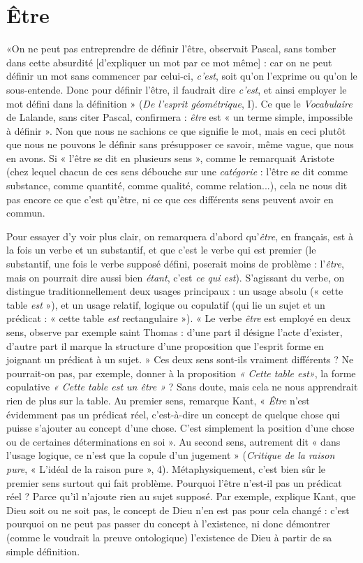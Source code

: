 \section{Être}
«On ne peut pas entreprendre de définir l’être, observait Pascal, sans
tomber dans cette absurdité [d’expliquer un mot par ce mot même] :
car on ne peut définir un mot sans commencer par celui-ci, {\it c'est}, soit qu’on
l’exprime ou qu’on le sous-entende. Donc pour définir l’être, il faudrait dire
{\it c'est}, et ainsi employer le mot défini dans la définition » ({\it De l'esprit géométrique},
I). Ce que le {\it Vocabulaire} de Lalande, sans citer Pascal, confirmera : {\it être} est « un
terme simple, impossible à définir ». Non que nous ne sachions ce que signifie
le mot, mais en ceci plutôt que nous ne pouvons le définir sans présupposer ce
savoir, même vague, que nous en avons. Si « l’être se dit en plusieurs sens »,
comme le remarquait Aristote (chez lequel chacun de ces sens débouche sur
une {\it catégorie} : l'être se dit comme substance, comme quantité, comme qualité,
comme relation...), cela ne nous dit pas encore ce que c’est qu'être, ni ce que
ces différents sens peuvent avoir en commun.

Pour essayer d’y voir plus clair, on remarquera d’abord qu’{\it être}, en français,
est à la fois un verbe et un substantif, et que c’est le verbe qui est premier (le
substantif, une fois le verbe supposé défini, poserait moins de problème : l'{\it être},
mais on pourrait dire aussi bien {\it étant}, c’est {\it ce qui est}). S'agissant du verbe, on
distingue traditionnellement deux usages principaux : un usage absolu (« cette
table {\it est} »), et un usage relatif, logique ou copulatif (qui lie un sujet et un
prédicat : « cette table {\it est} rectangulaire »). « Le verbe {\it être} est employé en deux
sens, observe par exemple saint Thomas : d’une part il désigne l’acte d’exister,
d’autre part il marque la structure d’une proposition que l'esprit forme en joignant
un prédicat à un sujet. » Ces deux sens sont-ils vraiment différents ? Ne
pourrait-on pas, par exemple, donner à la proposition {\it « Cette table est»}, la
forme copulative {\it « Cette table est un être »} ? Sans doute, mais cela ne nous
apprendrait rien de plus sur la table. Au premier sens, remarque Kant, « {\it Être}
n'est évidemment pas un prédicat réel, c’est-à-dire un concept de quelque
chose qui puisse s’ajouter au concept d’une chose. C’est simplement la position
d’une chose ou de certaines déterminations en soi ». Au second sens, autrement
dit « dans l’usage logique, ce n’est que la copule d’un jugement » ({\it Critique de
la raison pure}, « L'idéal de la raison pure », 4). Métaphysiquement, c’est bien
sûr le premier sens surtout qui fait problème. Pourquoi l'être n’est-il pas un
prédicat réel ? Parce qu’il n’ajoute rien au sujet supposé. Par exemple, explique
Kant, que Dieu soit ou ne soit pas, le concept de Dieu n’en est pas pour cela
changé : c’est pourquoi on ne peut pas passer du concept à l’existence, ni donc
démontrer (comme le voudrait la preuve ontologique) l'existence de Dieu à
partir de sa simple définition.

